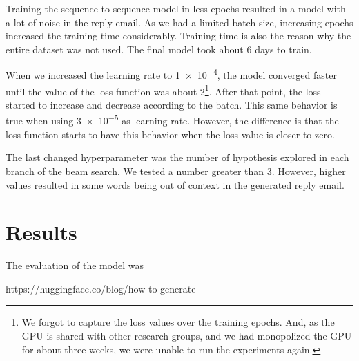\documentclass[letterpaper]{article}
\begin{document}
Training the sequence-to-sequence model in less epochs resulted in a model with a lot of noise in the reply email. As we had a limited batch size, increasing epochs increased the training time considerably. Training time is also the reason why the entire dataset was not used. The final model took about \num{6} days to train.

When we increased the learning rate to \num{1e-4}, the model converged faster until the value of the loss function was about \num{2}\footnote{We forgot to capture the loss values over the training epochs. And, as the GPU is shared with other research groups, and we had monopolized the GPU for about three weeks, we were unable to run the experiments again.}. After that point, the loss started to increase and decrease according to the batch. This same behavior is true when using \num{3e-5} as learning rate. However, the difference is that the loss function starts to have this behavior when the loss value is closer to zero.

The last changed hyperparameter was the number of hypothesis explored in each branch of the beam search. We tested a number greater than \num{3}. However, higher values resulted in some words being out of context in the generated reply email.


\section{Results}

The evaluation of the model was 



https://huggingface.co/blog/how-to-generate





\end{document}
